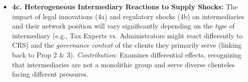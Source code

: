\begin{itemize}[leftmargin=*]
\begin{itemize}[leftmargin=\parindent]
        \item \textbf{4c. Heterogeneous Intermediary Reactions to Supply Shocks:} The impact of legal innovations (4a) and regulatory shocks (4b) on intermediaries and their network position will vary significantly depending on the \textit{type} of intermediary (e.g., Tax Experts vs. Administrators might react differently to CRS) and the \textit{governance context} of the clients they primarily serve (linking back to Prop 2 \& 3). \textit{Contribution:} Examines differential effects, recognizing that intermediaries are not a monolithic group and serve diverse clienteles facing different pressures.
    \end{itemize}
\end{itemize}

